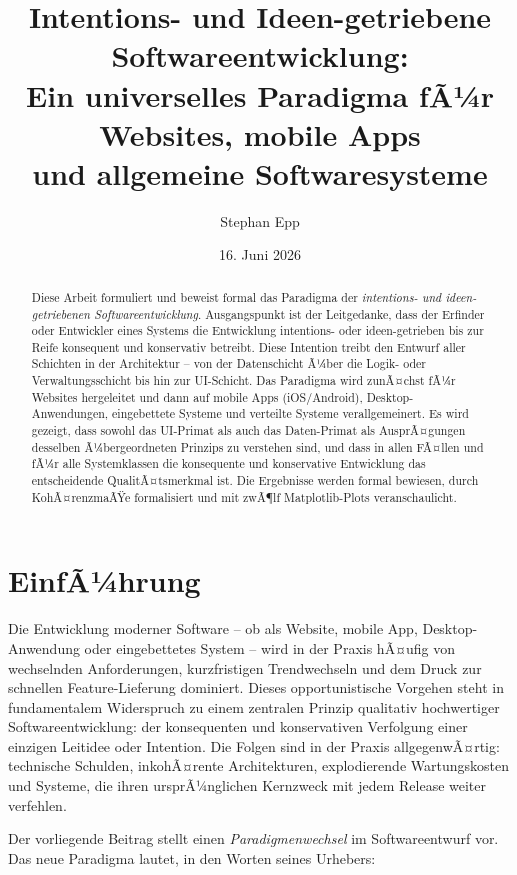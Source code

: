 ﻿\documentclass[a4paper,12pt]{article}
\title{\textbf{Intentions- und Ideen-getriebene Softwareentwicklung:}\\
\large Ein universelles Paradigma fÃ¼r Websites, mobile Apps\\
und allgemeine Softwaresysteme}
\author{Stephan Epp}
\date{16. Juni 2026}
\theoremstyle{definition}
\begin{document}
\maketitle

\begin{abstract}
Diese Arbeit formuliert und beweist formal das Paradigma der
\emph{intentions- und ideen-getriebenen Softwareentwicklung}. Ausgangspunkt ist
der Leitgedanke, dass der Erfinder oder Entwickler eines Systems die Entwicklung
intentions- oder ideen-getrieben bis zur Reife konsequent und konservativ betreibt.
Diese Intention treibt den Entwurf aller Schichten in der Architektur -- von der
Datenschicht Ã¼ber die Logik- oder Verwaltungsschicht bis hin zur UI-Schicht. Das
Paradigma wird zunÃ¤chst fÃ¼r Websites hergeleitet und dann auf mobile Apps
(iOS/Android), Desktop-Anwendungen, eingebettete Systeme und verteilte Systeme
verallgemeinert. Es wird gezeigt, dass sowohl das UI-Primat als auch das
Daten-Primat als AusprÃ¤gungen desselben Ã¼bergeordneten Prinzips zu verstehen
sind, und dass in allen FÃ¤llen und fÃ¼r alle Systemklassen die konsequente und
konservative Entwicklung das entscheidende QualitÃ¤tsmerkmal ist. Die Ergebnisse
werden formal bewiesen, durch KohÃ¤renzmaÃŸe formalisiert und mit zwÃ¶lf
Matplotlib-Plots veranschaulicht.
\end{abstract}

\tableofcontents
\newpage

\section{EinfÃ¼hrung}

Die Entwicklung moderner Software -- ob als Website, mobile App, Desktop-Anwendung
oder eingebettetes System -- wird in der Praxis hÃ¤ufig von wechselnden
Anforderungen, kurzfristigen Trendwechseln und dem Druck zur schnellen
Feature-Lieferung dominiert. Dieses opportunistische Vorgehen steht in
fundamentalem Widerspruch zu einem zentralen Prinzip qualitativ hochwertiger
Softwareentwicklung: der konsequenten und konservativen Verfolgung einer
einzigen Leitidee oder Intention. Die Folgen sind in der Praxis allgegenwÃ¤rtig:
technische Schulden, inkohÃ¤rente Architekturen, explodierende Wartungskosten
und Systeme, die ihren ursprÃ¼nglichen Kernzweck mit jedem Release weiter
verfehlen.

Der vorliegende Beitrag stellt einen \emph{Paradigmenwechsel} im Softwareentwurf
vor. Das neue Paradigma lautet, in den Worten seines Urhebers:
\end{document}
